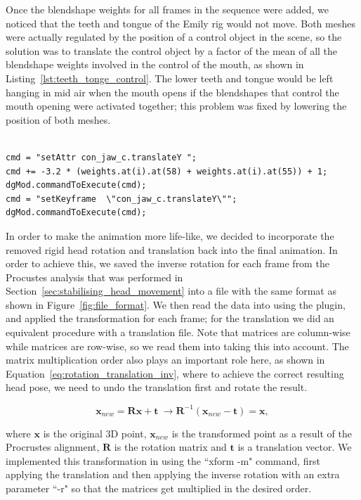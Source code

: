 Once the blendshape weights for all frames in the sequence were added, we noticed that the teeth and tongue of the Emily rig would not move.
Both meshes were actually regulated by the position of a control object in the scene, so the solution was to translate the control object by a factor of the mean of all the blendshape weights involved in the control of the mouth, as shown in Listing~\ref{lst:teeth_tonge_control}.
The lower teeth and tongue would be left hanging in mid air when the mouth opens if the blendshapes that control the mouth opening were activated together; this problem was fixed by lowering the position of both meshes.

\begin{lstlisting}[caption = Teeth and tongue control based on relevant weights., label = lst:teeth_tonge_control, frame=single]

cmd = "setAttr con_jaw_c.translateY ";
cmd += -3.2 * (weights.at(i).at(58) + weights.at(i).at(55)) + 1;
dgMod.commandToExecute(cmd);
cmd = "setKeyframe  \"con_jaw_c.translateY\"";
dgMod.commandToExecute(cmd);
\end{lstlisting}

In order to make the animation more life-like, we decided to incorporate the removed rigid head rotation and translation back into the final animation.
In order to achieve this, we saved the inverse rotation for each frame from the Procustes analysis that was performed in Section~\ref{sec:stabilising_head_movement} into a file with the same format as shown in Figure~\ref{fig:file_format}.
We then read the data into \Maya using the plugin, and applied the transformation for each frame; for the translation we did an equivalent procedure with a translation file.
Note that \Matlab matrices are column-wise while \Maya matrices are row-wise, so we read them into \Maya taking this into account.
The matrix multiplication order also plays an important role here, as shown in Equation~\ref{eq:rotation_translation_inv}, where to achieve the correct resulting head pose, we need to undo the translation first and rotate the result.

\begin{equation}
\mathbf{x}_{new} = \mathbf{R} \mathbf{x} + \mathbf{t} ~ \rightarrow  \mathbf{R}^{-1}(\mathbf{x}_{new} - \mathbf{t}) = \mathbf{x},
\label{eq:rotation_translation_inv}
\end{equation}

where $\mathbf{x}$ is the original 3D point, $\mathbf{x}_{new}$ is the transformed point as a result of the Procrustes alignment, $\mathbf{R}$ is the rotation matrix and $\mathbf{t}$ is a translation vector.
We implemented this transformation in \Maya using the ``xform -m" command, first applying the translation and then applying the inverse rotation with an extra parameter ``-r" so that the matrices get multiplied in the desired order.

